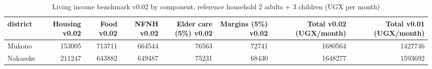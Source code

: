 \begin{table}[htbp]
\centering
\caption{Living income benchmark v0.02 by component, reference household 2 adults + 3 children (UGX per month)}
\label{tab:benchmark_components_v002}
\begin{tabular}{lrrrrrrr}
\toprule
district & Housing v0.02 & Food v0.02 & NFNH v0.02 & Elder care (5\%) v0.02 & Margins (5\%) v0.02 & Total v0.02 (UGX/month) & Total v0.01 (UGX/month) \\
\midrule
Mukono & 153005 & 713711 & 664544 & 76563 & 72741 & 1680564 & 1427746 \\
Nakaseke & 211247 & 643882 & 649487 & 75231 & 68430 & 1648277 & 1593692 \\
\bottomrule
\end{tabular}
\end{table}
